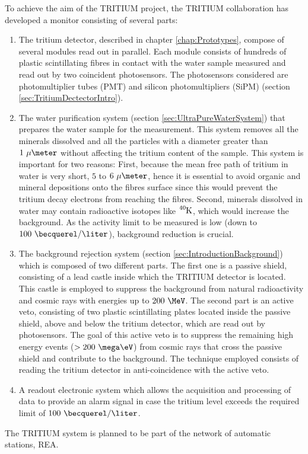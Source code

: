 To achieve the aim of the TRITIUM project, the TRITIUM collaboration has developed a monitor consisting of several parts: 

\begin{enumerate}

\item{} The tritium detector, described in chapter \ref{chap:Prototypes}, compose of several modules read out in parallel. Each module consists of hundreds of plastic scintillating fibres in contact with the water sample measured and read out by two coincident photosensors. The photosensors considered are photomultiplier tubes (PMT) and silicon photomultipliers (SiPM) (section \ref{sec:TritiumDectectorIntro}).

\item{} The water purification system (section \ref{sec:UltraPureWaterSystem}) that prepares the water sample for the measurement. This system removes all the minerals dissolved and all the particles with a diameter greater than $1~\mu\meter$ without affecting the tritium content of the sample. This system is important for two reasons: First, because the mean free path of tritium in water is very short, $5$ to $6~\mu\meter$,  hence it is essential to avoid organic and mineral depositions onto the fibres surface since this would prevent the tritium decay electrons from reaching the fibres. Second, minerals dissolved in water may contain radioactive isotopes like $\ce{^{40}K}$, which would increase the background. As the activity limit to be measured is low (down to $100~\becquerel/\liter$), background reduction is crucial.

\item{} The background rejection system (section \ref{sec:IntroductionBackground}) which is composed of two different parts. The first one is a passive shield, consisting of a lead castle inside which the TRITIUM detector is located. This castle is employed to suppress the background from natural radioactivity and cosmic rays with energies up to $200~\MeV$. The second part is an active veto, consisting of two plastic scintillating plates located inside the passive shield, above and below the tritium detector, which are read out by photosensors. The goal of this active veto is to suppress the remaining high energy events ($>200~\mega\eV$) from cosmic rays that cross the passive shield and contribute to the background. The technique employed consists of reading the tritium detector in anti-coincidence with the active veto.

\item{} A readout electronic system which allows the acquisition and processing of data to provide an alarm signal in case the tritium level exceeds the required limit of $100~\becquerel/\liter$.

\end{enumerate}

The TRITIUM system is planned to be part of the network of automatic stations, REA.